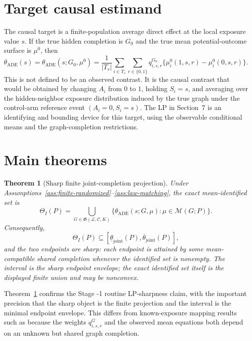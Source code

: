 \documentclass[11pt]{article}
\theoremstyle{definition}
\theoremstyle{plain}
\newtheorem{theorem}{Theorem}
\theoremstyle{remark}
\begin{document}
\section{Target causal estimand}
The causal target is a finite-population average direct effect at the local
exposure value \(s\).  If the true hidden completion is \(G_0\) and the true
mean potential-outcome surface is \(\mu^0\), then
\[
\theta_{\mathrm{ADE}}(s)
=\theta_{\mathrm{ADE}}(s;G_0,\mu^0)
=\frac{1}{|T_s|}
\sum_{i\in T_s}\sum_{r\in\{0,1\}}
q^{G_0}_{i,s,r}\{\mu^0_i(1,s,r)-\mu^0_i(0,s,r)\}.
\]
This is not defined to be an observed contrast.  It is the causal contrast that
would be obtained by changing \(A_i\) from \(0\) to \(1\), holding
\(S_i=s\), and averaging over the hidden-neighbor exposure distribution induced
by the true graph under the control-arm reference event \((A_i=0,S_i=s)\).  The
LP in Section~7 is an identifying and bounding device for this target, using
the observable conditional means and the graph-completion restrictions.

\section{Main theorems}
\begin{theorem}[Sharp finite joint-completion projection]\label{thm:joint-lp-sharp}
Under Assumptions~\ref{ass:finite-randomized}--\ref{ass:law-matching}, the
exact mean-identified set is
\[
\Theta_I(P)=
\bigcup_{G\in\mathfrak G(\mathcal L,\mathcal C,K)}
\{\theta_{\mathrm{ADE}}(s;G,\mu):\mu\in\mathcal M(G;P)\}.
\]
Consequently,
\[
\Theta_I(P)\subseteq
[\underline\theta_{\mathrm{joint}}(P),\overline\theta_{\mathrm{joint}}(P)],
\]
and the two endpoints are sharp: each endpoint is attained by some
mean-compatible shared completion whenever the identified set is nonempty.
The interval is the sharp endpoint envelope; the exact identified set itself is
the displayed finite union and may be nonconvex.
\end{theorem}

Theorem~\ref{thm:joint-lp-sharp} confirms the Stage -1 routine LP-sharpness
claim, with the important precision that the sharp object is the finite
projection and the interval is the minimal endpoint envelope.  This differs
from known-exposure mapping results such as \cite{AronowSamii2017} because the
weights \(q^G_{i,s,r}\) and the observed mean equations both depend on an
unknown but shared graph completion.
\end{document}
